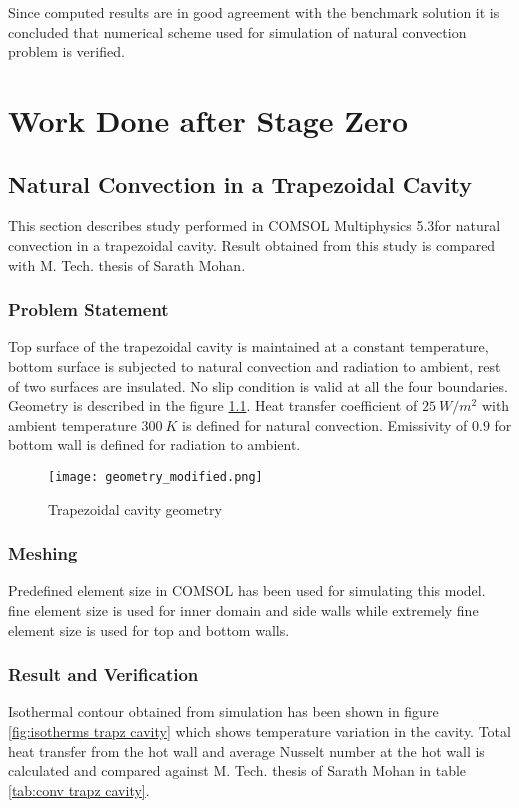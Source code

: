 Since computed results are in good agreement with the benchmark solution it is concluded that numerical scheme used for simulation of natural convection problem is verified.
\chapter{Work Done after Stage Zero}
\section{Natural Convection in a Trapezoidal Cavity}
This section describes study performed in COMSOL Multiphysics 5.3for natural convection in a trapezoidal cavity. Result obtained from this study is compared with M. Tech. thesis of Sarath Mohan. 
\subsection{Problem Statement}
Top surface of the trapezoidal cavity is maintained at a constant temperature, bottom surface is subjected to natural convection and radiation to ambient, rest of two surfaces are insulated. No slip condition is valid at all the four boundaries. Geometry is described in the figure \ref{fig:geometry modified}. Heat transfer coefficient of $25\ W/m^2$ with ambient temperature $300\ K$ is defined for natural convection. Emissivity of $0.9$ for bottom wall is defined for radiation to ambient.

\begin{figure}[H]
\begin{center}
\texttt{[image: geometry\_modified.png]}
\caption{Trapezoidal cavity geometry}
\label{fig:geometry modified}
\end{center}
\end{figure}
\subsection{Meshing}
Predefined element size in COMSOL has been used for simulating this model. fine element size is used for inner domain and side walls while extremely fine element size is used for top and bottom walls.

\subsection{Result and Verification}
Isothermal contour obtained from simulation has been shown in figure \ref{fig:isotherms trapz cavity} which shows temperature variation in the cavity. Total heat transfer from the hot wall and average Nusselt number at the hot wall is calculated and compared against M. Tech. thesis of Sarath Mohan in table \ref{tab:conv trapz cavity}.




